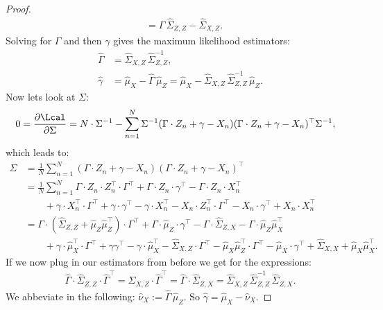 \begin{Lem}
\begin{proof}
\begin{align*}
       &= \Gamma\, \hat \Sigma_{Z,Z} - \hat \Sigma_{X,Z}.
 \end{align*}
Solving for $\Gamma$ and then $\gamma$ gives the maximum likelihood estimators:
\begin{align*}
    \hat\Gamma & = \hat\Sigma_{X,Z} \,\hat\Sigma_{Z,Z}^{-1}, \\
    \hat\gamma & = \hat \mu_X - \hat\Gamma\,\hat\mu_Z = \hat \mu_X - \hat\Sigma_{X,Z} \,\hat\Sigma_{Z,Z}^{-1}\,\hat\mu_Z.
\end{align*}
Now lets look at $\Sigma$:
\begin{align*}
    0 = \frac{\partial \Lcal}{\partial\Sigma} & = N \cdot \Sigma^{-1} - \sum_{n=1}^N  \Sigma^{-1} (\Gamma \cdot Z_n + \gamma - X_n)(\Gamma \cdot Z_n + \gamma - X_n)^\top \Sigma^{-1},
 \end{align*}
which leads to:
\begin{align*}
    \Sigma &= \frac{1}{N} \sum_{n=1}^N  (\Gamma \cdot Z_n + \gamma - X_n)(\Gamma \cdot Z_n + \gamma - X_n)^\top \\
           &= \frac{1}{N} \sum_{n=1}^N  \Gamma \cdot Z_n \cdot Z_n^\top \cdot \Gamma^\top + \Gamma \cdot Z_n \cdot \gamma^\top - 
           \Gamma \cdot Z_n \cdot X_n^\top \\ 
          &\qquad + \gamma \cdot X_n^\top \cdot \Gamma^\top + \gamma \cdot \gamma^\top - \gamma \cdot X_n^\top   
           - X_n \cdot Z_n^\top \cdot \Gamma^\top - X_n \cdot \gamma^\top + X_n \cdot X_n^\top  \\
          &= \Gamma \cdot ( \hat\Sigma_{Z,Z} + \hat\mu_Z \hat\mu_Z^\top) \cdot \Gamma^\top + \Gamma \cdot \hat\mu_Z\cdot\gamma^\top
          - \Gamma \cdot \hat\Sigma_{Z,X} - \Gamma \cdot \hat\mu_Z\hat\mu_X^\top \\
          &\qquad + \gamma \cdot \hat\mu_X^\top \cdot \Gamma^\top + \gamma \gamma^\top - \gamma \cdot \hat\mu_X^\top
          - \hat\Sigma_{X,Z} \cdot \Gamma^\top - \hat\mu_X\hat\mu_Z^\top \cdot \Gamma^\top 
          - \hat\mu_X \cdot \gamma^\top + \hat\Sigma_{X,X} + \hat\mu_X\hat\mu_X^\top.
 \end{align*}
If we now plug in our estimators from before we get for the expressions:
\begin{align*}
 \hat\Gamma\cdot\hat\Sigma_{Z,Z}\cdot\hat\Gamma^\top = \hat\Sigma_{X,Z}\cdot\hat\Gamma^\top = \hat\Gamma\cdot\hat\Sigma_{Z,X}
 = \hat\Sigma_{X,Z}\,\hat\Sigma_{Z,Z}^{-1}\,\hat\Sigma_{Z,X}. 
\end{align*}
We abbeviate in the following: $\hat \nu_X := \hat\Gamma\,\hat\mu_Z$. So $\hat \gamma = \hat\mu_X - \hat\nu_X$.

\end{proof}
\end{Lem}
